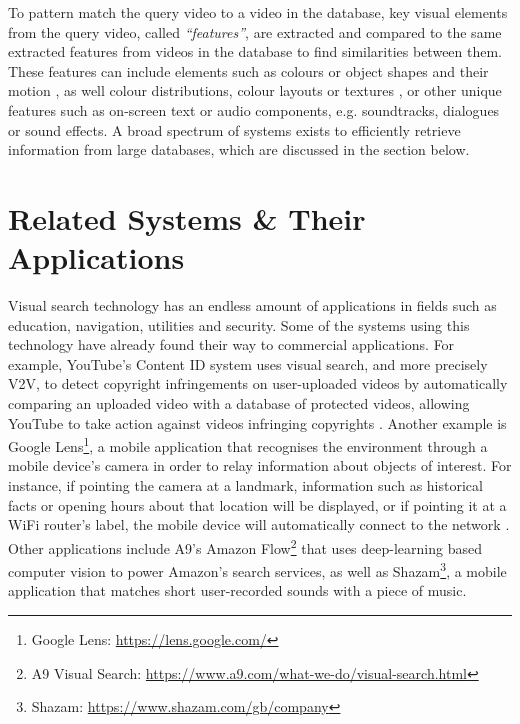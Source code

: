

To pattern match the query video to a video in the database, key visual elements from the query video, called \textit{``features''}, are extracted and compared to the same extracted features from videos in the database to find similarities between them. These features can include elements such as colours or object shapes and their motion \cite{patel2012}, as well colour distributions, colour layouts or textures \cite{petkovic2000}, or other unique features such as on-screen text or audio components, e.g. soundtracks, dialogues or sound effects. A broad spectrum of systems exists to efficiently retrieve information from large databases, which are discussed in the section below.


\section{Related Systems \& Their Applications}
\label{sec:v2v_applications}

Visual search technology has an endless amount of applications in fields such as education, navigation, utilities and security. Some of the systems using this technology have already found their way to commercial applications. For example, YouTube's Content ID system uses visual search, and more precisely V2V, to detect copyright infringements on user-uploaded videos by automatically comparing an uploaded video with a database of protected videos, allowing YouTube to take action against videos infringing copyrights \cite{youtube-content-id-2012}. Another example is Google Lens\footnote{Google Lens: \url{https://lens.google.com/}}, a mobile application that recognises the environment through a mobile device's camera in order to relay information about objects of interest. For instance, if pointing the camera at a landmark, information such as historical facts or opening hours about that location will be displayed, or if pointing it at a WiFi router's label, the mobile device will automatically connect to the network \cite{villaboas-google-lens2017}. Other applications include A9's Amazon Flow\footnote{A9 Visual Search: \url{https://www.a9.com/what-we-do/visual-search.html}} that uses deep-learning based computer vision to power Amazon's search services, as well as Shazam\footnote{Shazam: \url{https://www.shazam.com/gb/company}}, a mobile application that matches short user-recorded sounds with a piece of music.\\

